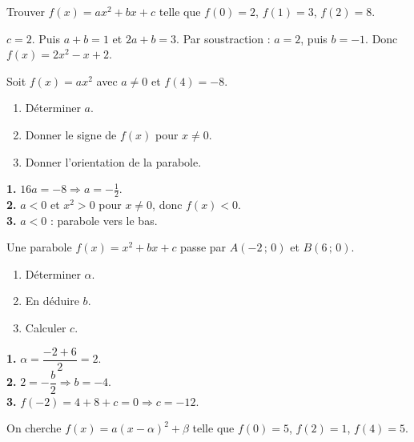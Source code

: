 \documentclass[11pt,a4paper]{article}
\begin{document}
\begin{affaire}
Trouver $f(x) = ax^2+bx+c$ telle que $f(0) = 2$, $f(1) = 3$, $f(2) = 8$.
\end{affaire}

\begin{revelation}
$c = 2$. Puis $a+b = 1$ et $2a+b = 3$. Par soustraction : $a = 2$, puis $b = -1$. Donc $f(x) = 2x^2 - x + 2$.
\end{revelation}

\begin{affaire}
Soit $f(x) = ax^2$ avec $a \neq 0$ et $f(4) = -8$.
\begin{enumerate}[leftmargin=*]
  \item Déterminer $a$.
  \item Donner le signe de $f(x)$ pour $x \neq 0$.
  \item Donner l'orientation de la parabole.
\end{enumerate}
\end{affaire}

\begin{revelation}
\textbf{1.} $16a = -8 \Rightarrow a = -\frac{1}{2}$. \\
\textbf{2.} $a<0$ et $x^2 >0$ pour $x \neq 0$, donc $f(x) < 0$. \\
\textbf{3.} $a<0$ : parabole vers le bas.
\end{revelation}

\begin{affaire}
Une parabole $f(x) = x^2 + bx + c$ passe par $A(-2\,;\,0)$ et $B(6\,;\,0)$.
\begin{enumerate}[leftmargin=*]
  \item Déterminer $\alpha$.
  \item En déduire $b$.
  \item Calculer $c$.
\end{enumerate}
\end{affaire}

\begin{revelation}
\textbf{1.} $\alpha = \dfrac{-2+6}{2} = 2$. \\
\textbf{2.} $2 = -\dfrac{b}{2} \Rightarrow b = -4$. \\
\textbf{3.} $f(-2) = 4 + 8 + c = 0 \Rightarrow c = -12$.
\end{revelation}

\begin{affaire}
On cherche $f(x) = a(x-\alpha)^2+\beta$ telle que $f(0) = 5$, $f(2) = 1$, $f(4) = 5$.
\end{affaire}
\end{document}
